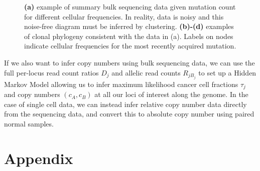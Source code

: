 \documentclass{article}
\begin{document}
\begin{figure}[h]
\begin{subfigure}[t]{0.11\linewidth}
		\caption{}
		\label{3}
	\end{subfigure}
\caption{\textbf{(a)} example of summary bulk sequencing data given mutation count for different cellular frequencies. In reality, data is noisy and this noise-free diagram must be inferred by clustering. \textbf{(b)-(d)} examples of clonal phylogeny consistent with the data in (a). Labels on nodes indicate cellular frequencies for the most recently acquired mutation.}
\end{figure}


If we also want to infer copy numbers using bulk sequencing data, we can use the full per-locus read count ratios $D_j$ and allelic read counts $R_{jB_j}$ to set up a Hidden Markov Model allowing us to infer maximum likelihood cancer cell fractions $\tau_j$ and copy numbers $(c_A, c_B)$ at all our loci of interest along the genome. In the case of single cell data, we can instead infer relative copy number data directly from the sequencing data, and convert this to absolute copy number using paired normal samples.


\section*{Appendix}


\end{document}

